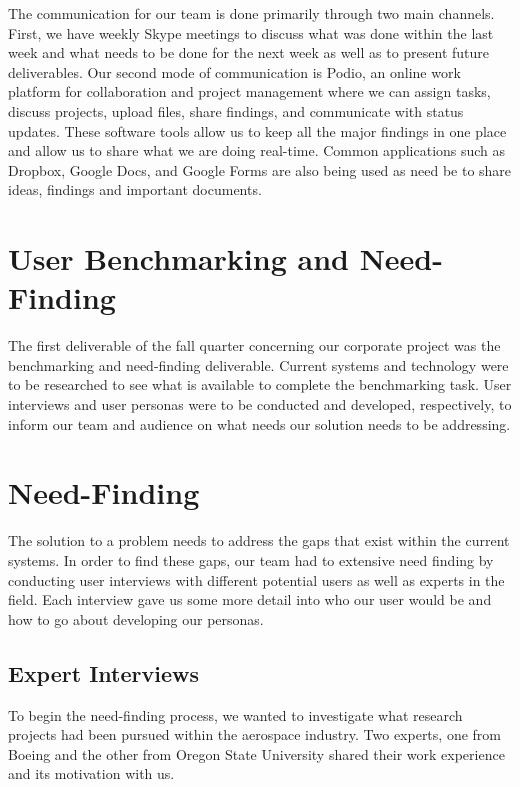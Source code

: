 The communication for our team is done primarily through two main channels.  First, we have weekly Skype meetings to discuss what was done within the last week and what needs to be done for the next week as well as to present future deliverables.  Our second mode of communication is Podio, an online work platform for collaboration and project management where we can assign tasks, discuss projects, upload files, share findings, and communicate with status updates. These software tools allow us to keep all the major findings in one place and allow us to share what we are doing real-time.  Common applications such as Dropbox, Google Docs, and Google Forms are also being used as need be to share ideas, findings and important documents. 

\section{User Benchmarking and Need-Finding}
The first deliverable of the fall quarter concerning our corporate project was the benchmarking and need-finding deliverable.  Current systems and technology were to be researched to see what is available to complete the benchmarking task.  User interviews and user personas were to be conducted and developed, respectively, to inform our team and audience on what needs our solution needs to be addressing. 

\section{Need-Finding}
The solution to a problem needs to address the gaps that exist within the current systems. In order to find these gaps, our team had to extensive need finding by conducting user interviews with different potential users as well as experts in the field.  Each interview gave us some more detail into who our user would be and how to go about developing our personas.

\subsection{Expert Interviews}
To begin the need-finding process, we wanted to investigate what research projects had been pursued within the aerospace industry. Two experts, one from Boeing and the other from Oregon State University shared their work experience and its motivation with us. 

